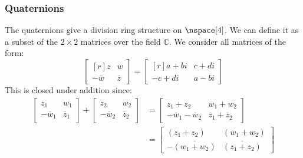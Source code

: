 \documentclass{article}                                                        %
\begin{document}
            \subsubsection{Quaternions}
                The quaternions give a division ring structure on $\nspace[4]$.
                We can define it as a subset of the $2\times{2}$ matrices over
                the field $\mathbb{C}$. We consider all matrices of the form:
                \begin{equation}
                    \begin{bmatrix*}[r]
                        z&w\\
                        \minus\overline{w}&\overline{z}
                    \end{bmatrix*}
                    =
                    \begin{bmatrix*}[r]
                        a+bi&c+di\\
                        \minus{c}+di&a-bi
                    \end{bmatrix*}
                \end{equation}
                This is closed under addition since:
                \begin{subequations}
                    \begin{align}
                        \begin{bmatrix}
                            z_{1}&w_{1}\\[1.2ex]
                            \minus\overline{w}_{1}&\overline{z}_{1}
                        \end{bmatrix}
                        +
                        \begin{bmatrix}
                            z_{2}&w_{2}\\[1.2ex]
                            \minus\overline{w}_{2}&\overline{z}_{2}
                        \end{bmatrix}
                        &=
                        \begin{bmatrix}
                            z_{1}+z_{2}&w_{1}+w_{2}\\[1.2ex]
                            \minus\overline{w}_{1}-\overline{w}_{2}
                            &\overline{z}_{1}+\overline{z}_{2}
                        \end{bmatrix}\\
                        &=
                        \begin{bmatrix}
                            (z_{1}+z_{2})&(w_{1}+w_{2})\\[1.2ex]
                            \minus\overline{(w_{1}+w_{2})}
                                &\overline{(z_{1}+z_{2})}
                        \end{bmatrix}
                    \end{align}
                \end{subequations}
\end{document}
